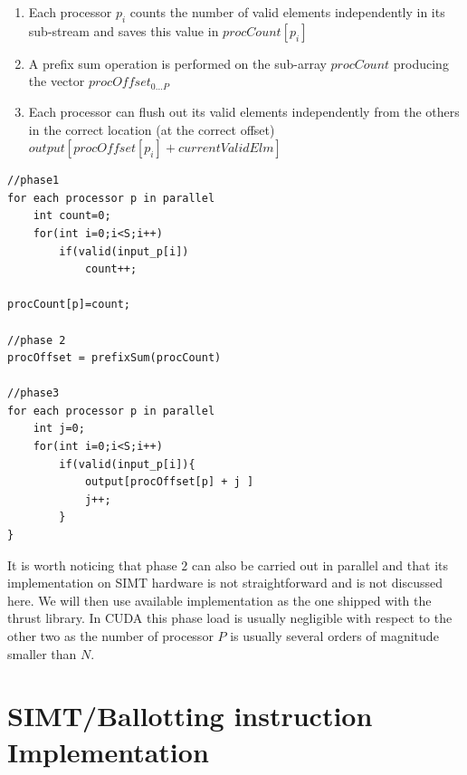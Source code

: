 \begin{enumerate}
	\item Each processor \(p_i\) counts the number of valid elements independently in its sub-stream and saves this value in \(procCount[p_i]\)
	\item A prefix sum operation is performed on the sub-array \(procCount\) producing the vector \(procOffset_{0\ldots P}\)
	\item Each processor can flush out its valid elements independently from the others in the correct location (at the correct offset) \(output[procOffset[p_i]+currentValidElm]\)
\end{enumerate}
\begin{lstlisting}
//phase1
for each processor p in parallel
	int count=0;
	for(int i=0;i<S;i++)
		if(valid(input_p[i])
			count++;

procCount[p]=count;

//phase 2
procOffset = prefixSum(procCount)

//phase3
for each processor p in parallel
	int j=0;
	for(int i=0;i<S;i++)
		if(valid(input_p[i]){
			output[procOffset[p] + j ]
			j++;
		}
}	
\end{lstlisting}

It is worth noticing that phase $2$ can also be carried out in parallel and that its implementation on SIMT hardware is not straightforward and is not discussed here. We will then use available implementation as the one shipped with the thrust library. In CUDA this phase load is usually negligible with respect to the other two as the number of processor $P$ is usually several orders of magnitude smaller than $N$.

\section{SIMT/Ballotting instruction Implementation}
